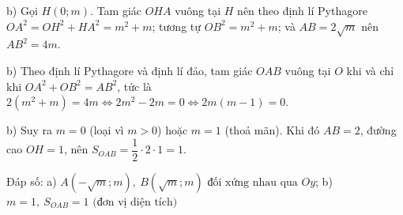 \begin{problem}[9DS-HSB2-015]
\begin{solution}
b) Gọi $H(0; m)$. Tam giác $OHA$ vuông tại $H$ nên theo định lí Pythagore $OA^2 = OH^2 + HA^2 = m^2 + m$; tương tự $OB^2 = m^2 + m$; và $AB = 2\sqrt{m}$ nên $AB^2 = 4m$.

b) Theo định lí Pythagore và định lí đảo, tam giác $OAB$ vuông tại $O$ khi và chỉ khi $OA^2 + OB^2 = AB^2$, tức là $2(m^2 + m) = 4m \Leftrightarrow 2m^2 - 2m = 0 \Leftrightarrow 2m(m - 1) = 0$.

b) Suy ra $m = 0$ (loại vì $m > 0$) hoặc $m = 1$ (thoả mãn). Khi đó $AB = 2$, đường cao $OH = 1$, nên $S_{OAB} = \dfrac{1}{2} \cdot 2 \cdot 1 = 1$.

Đáp số: a) $\boxed{A\left(-\sqrt{m}; m\right),\ B\left(\sqrt{m}; m\right) \text{ đối xứng nhau qua } Oy}$; b) $\boxed{m = 1,\ S_{OAB} = 1 \text{ (đơn vị diện tích)}}$
\end{solution}
\end{problem}

